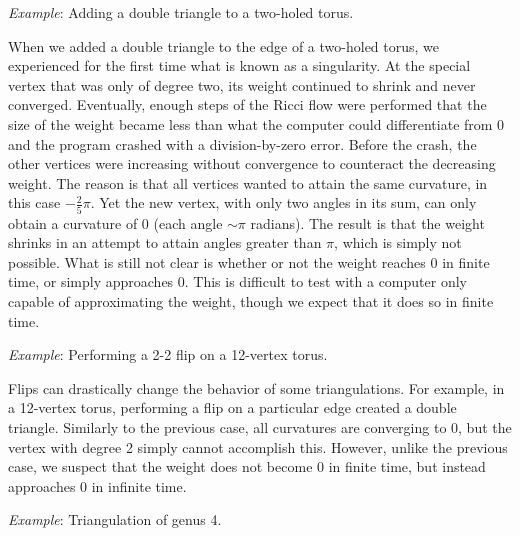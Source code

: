\documentclass[12pt]{article}
\begin{document}
\noindent \textit{Example}: Adding a double triangle to a two-holed torus.\newline

\noindent When we added a double triangle to the edge of a two-holed torus, we experienced for the first time what is known as a singularity. At the special vertex that was only of degree two, its weight continued to shrink and never converged. Eventually, enough steps of the Ricci flow were performed that the size of the weight became less than what the computer could differentiate from 0 and the program crashed with a division-by-zero error. Before the crash, the other vertices were increasing without convergence to counteract the decreasing weight. The reason is that all vertices wanted to attain the same curvature, in this case $-\frac{2}{5}\pi$. Yet the new vertex, with only two angles in its sum, can only obtain a curvature of 0 (each angle $\sim\pi$ radians). The result is that the weight shrinks in an attempt to attain angles greater than $\pi$, which is simply not possible. What is still not clear is whether or not the weight reaches 0 in finite time, or simply approaches 0. This is difficult to test with a computer only capable of approximating the weight, though we expect that it does so in finite time.\newline

\noindent \textit{Example}: Performing a 2-2 flip on a 12-vertex torus. \newline

\noindent Flips can drastically change the behavior of some triangulations. For example, in a 12-vertex torus, performing a flip on a particular edge created a double triangle. Similarly to the previous case, all curvatures are converging to 0, but the vertex with degree 2 simply cannot accomplish this. However, unlike the previous case, we suspect that the weight does not become 0 in finite time, but instead approaches 0 in infinite time.\newline

\noindent \textit{Example}: Triangulation of genus 4.\newline
\end{document}
